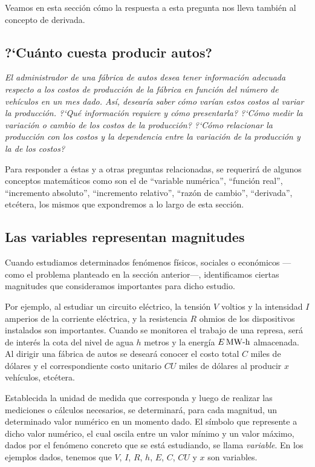 Veamos en esta sección cómo la respuesta a esta pregunta nos lleva también al concepto de derivada.

\subsection{?`Cuánto cuesta producir autos?}

\begingroup
\itshape El administrador de una fábrica de autos desea tener información adecuada respecto a los
costos de producción de la fábrica en función del número de vehículos en un mes dado. Así, desearía
saber cómo varían estos costos al variar la producción. ?`Qué información requiere y cómo
presentarla? ?`Cómo medir la variación o cambio de los costos de la producción? ?`Cómo relacionar la
producción con los costos y la dependencia entre la variación de la producción y la de los costos?
\endgroup

Para responder a éstas y a otras preguntas relacionadas, se requerirá de algunos conceptos
matemáticos como son el de ``variable numérica'', ``función real'', ``incremento absoluto'',
``incremento relativo'', ``razón de cambio'', ``derivada'', etcétera, los mismos que expondremos a
lo largo de esta sección.

\subsection{Las variables representan magnitudes}
Cuando estudiamos determinados fenómenos físicos, sociales o económicos ---como el problema
planteado en la sección anterior---, identificamos ciertas magnitudes que consideramos importantes
para dicho estudio.

Por ejemplo, al estudiar un circuito eléctrico, la tensión $V$ voltios y la intensidad $I$ amperios
de la corriente eléctrica, y la resistencia $R$ ohmios de los dispositivos instalados son
importantes. Cuando se monitorea el trabajo de una represa, será de interés la cota del nivel de
agua $h$ metros y la energía $E\operatorname{MW-h}$ almacenada. Al dirigir una fábrica de autos se deseará conocer
el costo total $C$ miles de dólares y el correspondiente costo unitario $CU$ miles de dólares al
producir $x$ vehículos, etcétera.

Establecida la unidad de medida que corresponda y luego de realizar las mediciones o cálculos
necesarios, se determinará, para cada magnitud, un determinado valor numérico en un momento dado.
El símbolo que represente a dicho valor numérico, el cual oscila entre un valor mínimo y un valor
máximo, dados por el fenómeno concreto que se está estudiando, se llama \emph{variable}. En los
ejemplos dados, tenemos que $V$, $I$, $R$, $h$, $E$, $C$, $CU$ y $x$ son variables.

